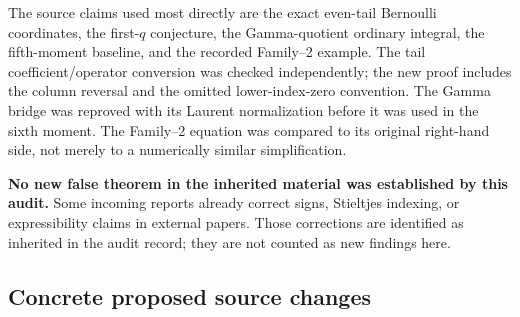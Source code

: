 \documentclass[11pt,a4paper]{article}
\numberwithin{equation}{section}
\theoremstyle{definition}
\theoremstyle{remark}
\begin{document}
The source claims used most directly are the exact even-tail
Bernoulli coordinates, the first-$q$ conjecture, the Gamma-quotient
ordinary integral, the fifth-moment baseline, and the recorded
Family--2 example.  The tail coefficient/operator conversion was
checked independently; the new proof includes the column reversal
and the omitted lower-index-zero convention.  The Gamma bridge
was reproved with its Laurent normalization before it was used in
the sixth moment.  The Family--2 equation was compared to its
original right-hand side, not merely to a numerically similar
simplification.

\textbf{No new false theorem in the inherited material was established
by this audit.}  Some incoming reports already correct signs,
Stieltjes indexing, or expressibility claims in external papers.
Those corrections are identified as inherited in the audit record;
they are not counted as new findings here.

\subsection{Concrete proposed source changes}
\end{document}
